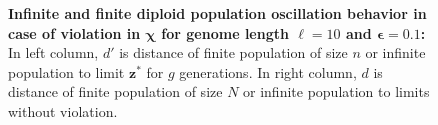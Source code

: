 \begin{figure}[h]
\begin{center}
\hspace{-3em}%
\vspace{-0.5em}  \hspace{-3em}%


\caption{\textbf{Infinite and finite diploid population oscillation behavior in case of violation in $\bm{\chi}$ for genome length $\ell = 10$ and $\bm{\epsilon} = 0.1$:} 
  In left column, $d'$ is distance of finite population of size $n$ or infinite population to limit $\bm{z}^\ast$ for $g$ generations. In right column, $d$ is distance of finite population of size $N$ or infinite population to limits without violation.}
\label{oscillation_10d_vio_chi_0.1}
\end{center}
\end{figure}

